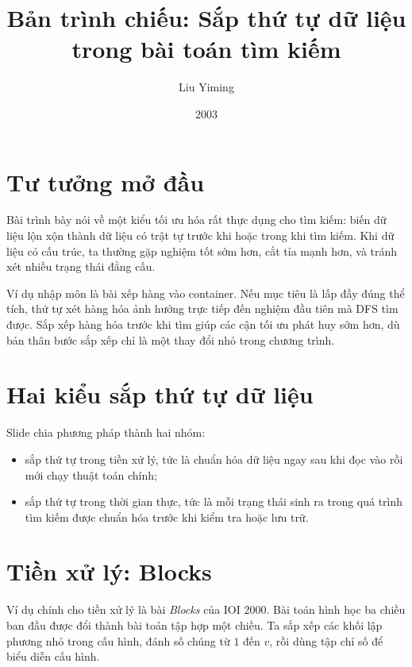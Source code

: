 \documentclass[11pt]{article}
\title{Bản trình chiếu: Sắp thứ tự dữ liệu trong bài toán tìm kiếm}
\author{Liu Yiming}
\date{2003}
\begin{document}
\maketitle


\section{Tư tưởng mở đầu}

Bài trình bày nói về một kiểu tối ưu hóa rất thực dụng cho tìm kiếm: biến dữ
liệu lộn xộn thành dữ liệu có trật tự trước khi hoặc trong khi tìm kiếm. Khi
dữ liệu có cấu trúc, ta thường gặp nghiệm tốt sớm hơn, cắt tỉa mạnh hơn, và
tránh xét nhiều trạng thái đẳng cấu.

Ví dụ nhập môn là bài xếp hàng vào container. Nếu mục tiêu là lấp đầy đúng
thể tích, thứ tự xét hàng hóa ảnh hưởng trực tiếp đến nghiệm đầu tiên mà DFS
tìm được. Sắp xếp hàng hóa trước khi tìm giúp các cận tối ưu phát huy sớm
hơn, dù bản thân bước sắp xếp chỉ là một thay đổi nhỏ trong chương trình.

\section{Hai kiểu sắp thứ tự dữ liệu}

Slide chia phương pháp thành hai nhóm:
\begin{itemize}
  \item sắp thứ tự trong tiền xử lý, tức là chuẩn hóa dữ liệu ngay sau khi đọc
  vào rồi mới chạy thuật toán chính;
  \item sắp thứ tự trong thời gian thực, tức là mỗi trạng thái sinh ra trong
  quá trình tìm kiếm được chuẩn hóa trước khi kiểm tra hoặc lưu trữ.
\end{itemize}

\section{Tiền xử lý: Blocks}

Ví dụ chính cho tiền xử lý là bài \textit{Blocks} của IOI 2000. Bài toán hình
học ba chiều ban đầu được đổi thành bài toán tập hợp một chiều. Ta sắp xếp
các khối lập phương nhỏ trong cấu hình, đánh số chúng từ \(1\) đến \(v\), rồi
dùng tập chỉ số để biểu diễn cấu hình.
\end{document}
